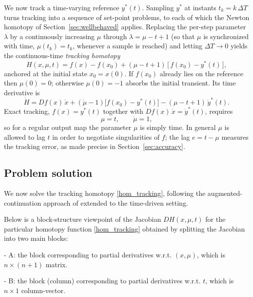 \documentclass[11pt,american]{article}
\theoremstyle{definition}
\theoremstyle{plain}
\theoremstyle{remark}
\begin{document}
We now track a time-varying reference $y^*(t)$. Sampling $y^*$ at instants $t_k = k\,\Delta T$ turns tracking into a sequence of set-point problems, to each of which the Newton homotopy of Section~\ref{sec:wellbehaved} applies. Replacing the per-step parameter $\lambda$ by a continuously increasing $\mu$ through $\lambda = \mu - t + 1$ (so that $\mu$ is synchronized with time, $\mu(t_k) = t_k$, whenever a sample is reached) and letting $\Delta T \to 0$ yields the continuous-time \emph{tracking homotopy}
\begin{equation}\label{hom_tracking}
H(x,\mu, t) = f(x) - f(x_0) + (\mu - t + 1)\,\bigl[\, f(x_0) - y^*(t) \,\bigr],
\end{equation}
anchored at the initial state $x_0 = x(0)$. If $f(x_0)$ already lies on the reference then $\mu(0)=0$; otherwise $\mu(0) = -1$ absorbs the initial transient. Its time derivative is
\begin{equation}\label{diff_hom_tracking}
\dot H = D f(x)\,\dot x + (\dot\mu - 1)\bigl[ f(x_0) - y^*(t) \bigr] - (\mu - t + 1)\,\dot y^*(t).
\end{equation}
Exact tracking, $f(x) = y^*(t)$ together with $Df(x)\,\dot x = \dot y^*(t)$, requires
\begin{equation}\label{tracking_conditions}
\mu = t, \qquad \dot\mu = 1,
\end{equation}
so for a regular output map the parameter $\mu$ is simply time. In general $\mu$ is allowed to lag $t$ in order to negotiate singularities of $f$; the lag $e = t-\mu$ measures the tracking error, as made precise in Section~\ref{sec:accuracy}.

\subsection{Problem solution}

We now solve the tracking homotopy \eqref{hom_tracking}, following the augmented-continuation approach of \cite{Borisevich2013,Borisevich2015} extended to the time-driven setting.

Below is a block-structure viewpoint of the Jacobian $D H(x,\mu,t)$ for the particular homotopy function \eqref{hom_tracking} obtained by splitting the Jacobian into two main blocks:  

- A: the block corresponding to partial derivatives w.r.t. $(x,\mu)$, which is $n \times (n+1)$ matrix.  

- B: the block (column) corresponding to partial derivatives w.r.t. $t$, which is $n \times 1$ column-vector.
\end{document}
